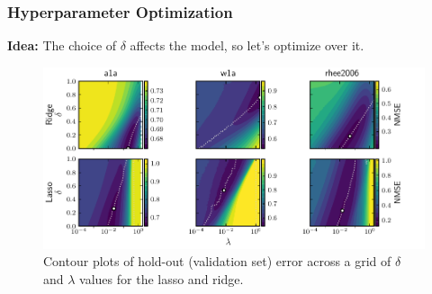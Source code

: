 \documentclass[10pt]{beamer}
\begin{document}
\begin{frame}[c]
  \frametitle{Hyperparameter Optimization}

  \textbf{Idea:} The choice of \(\delta\) affects the model, so let's optimize over it.

  \begin{figure}[htpb]
    \centering
    \includegraphics[width=\textwidth]{figures/paper6-hyperopt_surfaces.pdf}
    \caption{%
      Contour plots of hold-out (validation set) error across a grid of \(\delta\) and \(\lambda\) values for the
      lasso and ridge.
    }
  \end{figure}
\end{frame}
\end{document}

